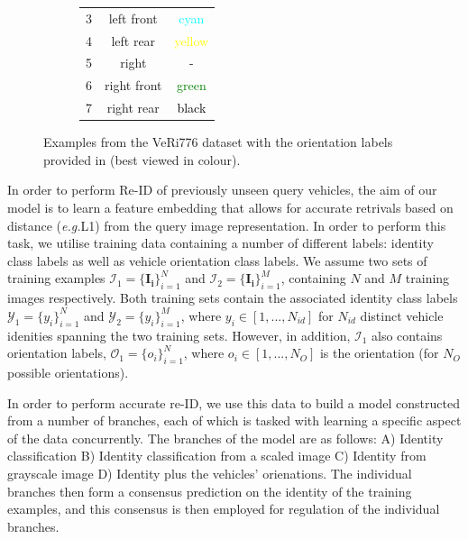 \documentclass[10pt,twocolumn,letterpaper]{article}
\def\eg{\emph{e.g.\hspace{0.3em}}}
\begin{document}
\begin{figure}
\begin{subfigure}{.4\textwidth}
\begin{tabular}{c | c | c}
      3 & left front & \textcolor{cyan}{cyan}  \\
      4 & left rear & \textcolor{yellow}{yellow}  \\
      5 & right  & - \\
      6 & right front & \textcolor{green}{green} \\
      7 & right rear & \textcolor{black}{black} \\
      \hline
    \end{tabular}
  \end{subfigure}
  \caption{Examples from the VeRi776 dataset with the orientation labels provided in \cite{wang2017orientation} (best viewed in colour).}
  \label{T:veri_veh_orientations}
\end{figure}

In order to perform Re-ID of previously unseen query vehicles, the aim of our model is to learn a feature embedding that allows for accurate retrivals based on distance (\eg L1) from the query image representation. In order to perform this task, we utilise training data containing a number of different labels: identity class labels as well as vehicle orientation class labels.
We assume two sets of training examples $\mathcal{I}_1 = \{\mathbf{I_i}\}_{i=1}^N$ and $\mathcal{I}_2 = \{\mathbf{I_i}\}_{i=1}^M$, containing $N$ and $M$ training images respectively. Both training sets contain the associated identity class labels $\mathcal{Y}_1=\{y_i\}_{i=1}^N$ and $\mathcal{Y}_2=\{y_i\}_{i=1}^M$, where $y_i \in \left[1,...,N_{id}\right]$ for $N_{id}$ distinct vehicle idenities spanning the two training sets. However, in addition, $\mathcal{I}_1$ also contains orientation labels, $\mathcal{O_1}=\{o_i\}_{i=1}^N$, where $o_i \in \left[1,...,N_O\right]$ is the orientation (for $N_O$ possible orientations).

In order to perform accurate re-ID, we use this data to build a model constructed from a number of branches, each of which is tasked with learning a specific aspect of the data concurrently. The branches of the model are as follows: A) Identity classification B) Identity classification from a scaled image C) Identity from grayscale image D) Identity plus the vehicles' orienations. The individual branches then form a consensus prediction on the identity of the training examples, and this consensus is then employed for regulation of the individual branches.
\end{document}

